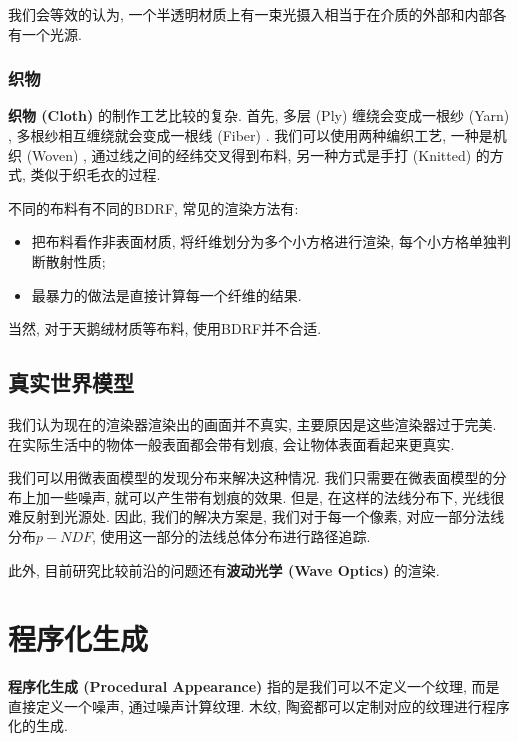 我们会等效的认为, 一个半透明材质上有一束光摄入相当于在介质的外部和内部各有一个光源. 

\subsubsection{织物}

\textbf{织物 (Cloth) }的制作工艺比较的复杂. 首先, 多层 (Ply) 缠绕会变成一根纱 (Yarn) , 多根纱相互缠绕就会变成一根线 (Fiber) . 我们可以使用两种编织工艺, 一种是机织 (Woven) , 通过线之间的经纬交叉得到布料, 另一种方式是手打 (Knitted) 的方式, 类似于织毛衣的过程. 

不同的布料有不同的BDRF, 常见的渲染方法有: 
\begin{itemize}
	\item 把布料看作非表面材质, 将纤维划分为多个小方格进行渲染, 每个小方格单独判断散射性质; 
	\item 最暴力的做法是直接计算每一个纤维的结果. 
\end{itemize}

当然, 对于天鹅绒材质等布料, 使用BDRF并不合适. 

\subsection{真实世界模型}

我们认为现在的渲染器渲染出的画面并不真实, 主要原因是这些渲染器过于完美. 在实际生活中的物体一般表面都会带有划痕, 会让物体表面看起来更真实. 

我们可以用微表面模型的发现分布来解决这种情况. 我们只需要在微表面模型的分布上加一些噪声, 就可以产生带有划痕的效果. 但是, 在这样的法线分布下, 光线很难反射到光源处. 因此, 我们的解决方案是, 我们对于每一个像素, 对应一部分法线分布$p-NDF$, 使用这一部分的法线总体分布进行路径追踪. 

此外, 目前研究比较前沿的问题还有\textbf{波动光学 (Wave Optics) }的渲染. 

\section{程序化生成}

\textbf{程序化生成 (Procedural Appearance) }指的是我们可以不定义一个纹理, 而是直接定义一个噪声, 通过噪声计算纹理. 木纹, 陶瓷都可以定制对应的纹理进行程序化的生成. 
